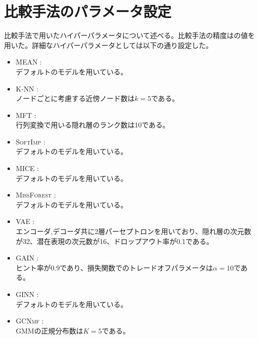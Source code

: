 \chapter{比較手法のパラメータ設定}
比較手法で用いたハイパーパラメータについて述べる。比較手法の精度は\cite{taguchi2021graph}の値を用いた。詳細なハイパーパラメータとしては以下の通り設定した。
\begin{itemize}
    \item \textsc{MEAN} \cite{GarciaLaencina2010}: \\
        デフォルトのモデルを用いている。
    \item \textsc{K-NN} \cite{batista2002study}:\\
        ノードごとに考慮する近傍ノード数は$k=5$である。
    \item \textsc{MFT} \cite{koren2009mf}:\\
       行列変換で用いる隠れ層のランク数は10である。
    \item \textsc{SoftImp} \cite{mazumder2010soft}:\\
        デフォルトのモデルを用いている。
    \item \textsc{MICE} \cite{buuren2010mice}:\\
        デフォルトのモデルを用いている。
    \item \textsc{MissForest} \cite{Stekhoven2011missforest}:\\
        デフォルトのモデルを用いている。
    \item \textsc{VAE} \cite{kingma2013auto}:\\
        エンコーダ,デコーダ共に2層パーセプトロンを用いており、隠れ層の次元数が32、潜在表現の次元数が16、ドロップアウト率が0.1である。
    \item \textsc{GAIN} \cite{yoon2018gain}:\\
        ヒント率が0.9であり、損失関数でのトレードオフパラメータは$\alpha=10$である。
    \item \textsc{GINN} \cite{spinelli2019ginn}:\\
        デフォルトのモデルを用いている。
    \item \textsc{GCNmf} \cite{taguchi2021graph}:\\
       GMMの正規分布数は$K=5$である。
\end{itemize}
